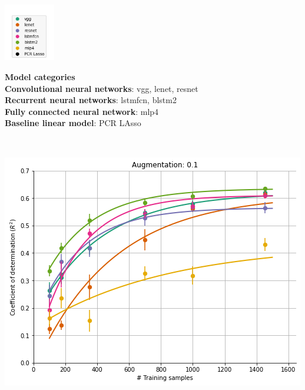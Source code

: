\documentclass[a0paper,landscape,fontscale=0.365]{baposter}
\newenvironment{Figure}
  {\par\medskip\noindent\minipage{\linewidth}}
  {\endminipage\par\medskip}
\begin{document}
\begin{poster}
{\begin{multicols}{4}
    \begin{minipage}[c]{0.3\linewidth}
    \begin{Figure}
    \includegraphics[height=2.5cm]{figures/legend}
    \end{Figure}
    \end{minipage}
    \begin{minipage}[c]{0.6\linewidth}
    \begin{framed}
        \small
        \textbf{Model categories} \\
        \textbf{Convolutional neural networks}: vgg, lenet, resnet \\
        \textbf{Recurrent neural networks}: lstmfcn, blstm2  \\
        \textbf{Fully connected neural network}: mlp4 \\
        \textbf{Baseline linear model}: PCR LAsso
    \end{framed}
    \end{minipage}
\end{multicols}
\\
\begin{multicols}{4}
    \begin{Figure}
        \centering
        \includegraphics[width=1.0\linewidth]{figures/curves_aug_10}
    \end{Figure}


\end{multicols}}
\end{poster}
\end{document}

